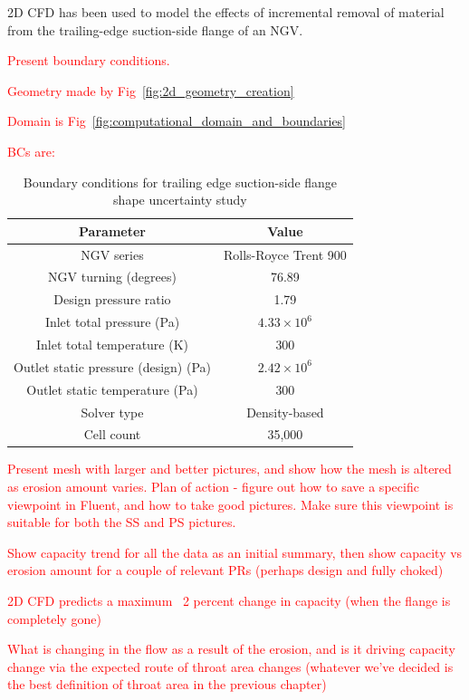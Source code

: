 \documentclass[a4paper, 11pt, oneside]{report}
\begin{document}
2D CFD has been used to model the effects of incremental removal of material from the trailing-edge suction-side flange of an NGV. 

\textcolor{red}{Present boundary conditions.}

\textcolor{red}{Geometry made by Fig~\ref{fig:2d_geometry_creation}}

\textcolor{red}{Domain is Fig~\ref{fig:computational_domain_and_boundaries}}

\textcolor{red}{BCs are:}

\begin{table}[H]
\caption{Boundary conditions for trailing edge suction-side flange shape uncertainty study}
\label{ss_cutbacks_parameters}
\begin{center}
\begin{tabular}{|c|c|}
\hline
Parameter & Value\\
\hline
NGV series & Rolls-Royce Trent 900\\
NGV turning (degrees) & 76.89\\
Design pressure ratio & 1.79\\
Inlet total pressure (Pa) & $4.33 \times 10^6$\\
Inlet total temperature (K) & 300\\
Outlet static pressure (design) (Pa) & $2.42 \times 10^6$\\
Outlet static temperature (Pa) & 300\\
Solver type & Density-based\\
Cell count & 35,000\\
\hline
\end{tabular}
\end{center}
\end{table}

\textcolor{red}{Present mesh with larger and better pictures, and show how the mesh is altered as erosion amount varies.}
	\textcolor{red}{Plan of action - figure out how to save a specific viewpoint in Fluent, and how to take good pictures. Make sure this viewpoint is suitable for both the SS and PS pictures.}

\textcolor{red}{Show capacity trend for all the data as an initial summary, then show capacity vs erosion amount for a couple of relevant PRs (perhaps design and fully choked)}

\textcolor{red}{2D CFD predicts a maximum ~2 percent change in capacity (when the flange is completely gone)}

\textcolor{red}{What is changing in the flow as a result of the erosion, and is it driving capacity change via the expected route of throat area changes (whatever we've decided is the best definition of throat area in the previous chapter)}
\end{document}
